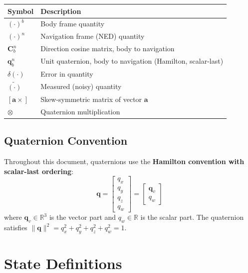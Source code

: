 \documentclass[11pt,a4paper]{article}
\newcommand{\mat}[1]{\mathbf{#1}}
\newcommand{\vect}[1]{\boldsymbol{#1}}
\newcommand{\quat}[1]{\mathbf{#1}}
\newcommand{\skewmat}[1]{\left[#1 \times\right]}
\newcommand{\Rn}{\mathbb{R}}
\begin{document}
\begin{center}
\begin{tabular}{ll}
    \toprule
    Symbol & Description \\
    \midrule
    $(\cdot)^b$ & Body frame quantity \\
    $(\cdot)^n$ & Navigation frame (NED) quantity \\
    $\mat{C}_b^n$ & Direction cosine matrix, body to navigation \\
    $\quat{q}_b^n$ & Unit quaternion, body to navigation (Hamilton, scalar-last) \\
    $\delta(\cdot)$ & Error in quantity \\
    $\tilde{(\cdot)}$ & Measured (noisy) quantity \\
    $\skewmat{\vect{a}}$ & Skew-symmetric matrix of vector $\vect{a}$ \\
    $\otimes$ & Quaternion multiplication \\
    \bottomrule
\end{tabular}
\end{center}

\subsection{Quaternion Convention}

Throughout this document, quaternions use the \textbf{Hamilton convention with scalar-last ordering}:
\begin{equation}
    \quat{q} = \begin{bmatrix} q_x \\ q_y \\ q_z \\ q_w \end{bmatrix} = \begin{bmatrix} \vect{q}_v \\ q_w \end{bmatrix}
\end{equation}
where $\vect{q}_v \in \Rn^3$ is the vector part and $q_w \in \Rn$ is the scalar part. The quaternion satisfies $\|\quat{q}\|^2 = q_x^2 + q_y^2 + q_z^2 + q_w^2 = 1$.

\section{State Definitions}
\end{document}
